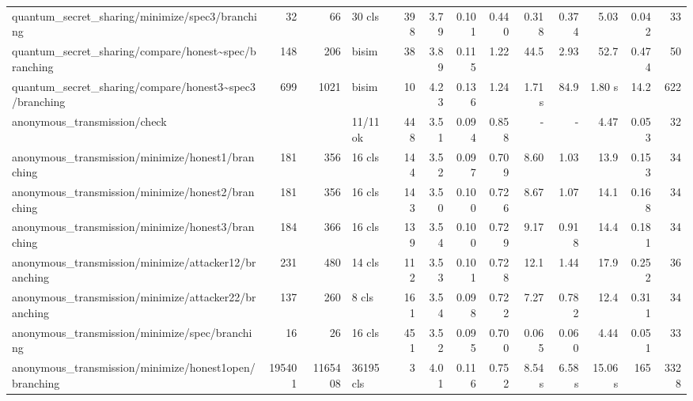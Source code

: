 \begin{tabular}{lrrlrrrrrrrrr}
	quantum\_secret\_sharing/minimize/spec3/branching                                   & 32     & 66      & 30 cls    & 398  & 3.79  & 0.101 & 0.440     & 0.318   & 0.374   & 5.03    & 0.042 & 33      \\
	quantum\_secret\_sharing/compare/honest\textasciitilde{}spec/branching              & 148    & 206     & bisim     & 38   & 3.89  & 0.115 & 1.22      & 44.5    & 2.93    & 52.7    & 0.474 & 50      \\
	quantum\_secret\_sharing/compare/honest3\textasciitilde{}spec3/branching            & 699    & 1021    & bisim     & 10   & 4.23  & 0.136 & 1.24      & 1.71 s  & 84.9    & 1.80 s  & 14.2  & 622     \\
	anonymous\_transmission/check                                                       &        &         & 11/11 ok  & 448  & 3.51  & 0.094 & 0.858     & -       & -       & 4.47    & 0.053 & 32      \\
	anonymous\_transmission/minimize/honest1/branching                                  & 181    & 356     & 16 cls    & 144  & 3.52  & 0.097 & 0.709     & 8.60    & 1.03    & 13.9    & 0.153 & 34      \\
	anonymous\_transmission/minimize/honest2/branching                                  & 181    & 356     & 16 cls    & 143  & 3.50  & 0.100 & 0.726     & 8.67    & 1.07    & 14.1    & 0.168 & 34      \\
	anonymous\_transmission/minimize/honest3/branching                                  & 184    & 366     & 16 cls    & 139  & 3.54  & 0.100 & 0.729     & 9.17    & 0.918   & 14.4    & 0.181 & 34      \\
	anonymous\_transmission/minimize/attacker12/branching                               & 231    & 480     & 14 cls    & 112  & 3.53  & 0.101 & 0.728     & 12.1    & 1.44    & 17.9    & 0.252 & 36      \\
	anonymous\_transmission/minimize/attacker22/branching                               & 137    & 260     & 8 cls     & 161  & 3.54  & 0.098 & 0.722     & 7.27    & 0.782   & 12.4    & 0.311 & 34      \\
	anonymous\_transmission/minimize/spec/branching                                     & 16     & 26      & 16 cls    & 451  & 3.52  & 0.095 & 0.700     & 0.065   & 0.060   & 4.44    & 0.051 & 33      \\
	anonymous\_transmission/minimize/honest1open/branching                              & 195401 & 1165408 & 36195 cls & 3    & 4.01  & 0.116 & 0.752     & 8.54 s  & 6.58 s  & 15.06 s & 165   & 3328    \\

\end{tabular}
